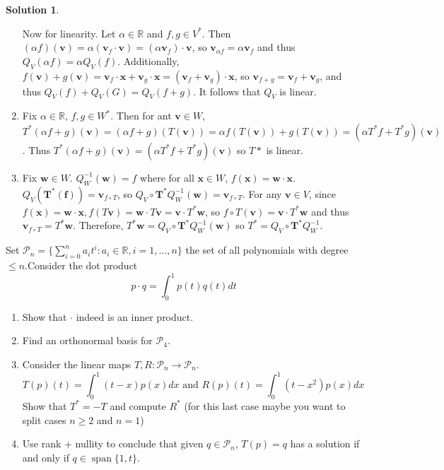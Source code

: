 \documentclass[11pt]{article}
\theoremstyle{definition}
\newenvironment{customex}[1]
  {\renewcommand\theinnercustomex{#1}\innercustomex}
  {\endinnercustomex}
\newtheorem*{solution}{Solution}
\newcommand{\R}{\mathbb{R}}
\DeclareMathOperator{\spn}{span}
\newcommand{\vv}{\mathbf{v}}
\newcommand{\vw}{\mathbf{w}}
\newcommand{\vx}{\mathbf{x}}
\newcommand{\poly}{\mathcal{P}}
\begin{document}
\begin{solution}
\begin{enumerate}[label = \alph*)]
            Now for linearity. Let $\alpha \in \R$ and $f, g \in V^*$. Then $(\alpha f)(\vv) = \alpha (\vv_f \cdot \vv) = (\alpha \vv_f) \cdot \vv$, so $\vv_{\alpha f} = \alpha \vv_f$ and thus $Q_V(\alpha f) = \alpha Q_V(f)$. Additionally, $f(\vv) + g(\vv) = \vv_f \cdot \vx + \vv_g \cdot \vx = (\vv_f + \vv_g) \cdot \vx$, so $\vv_{f+g} = \vv_f + \vv_g$, and thus $Q_V(f) + Q_V(G) = Q_V(f+g)$. It follows that $Q_V$ is linear.
            
            \item Fix $\alpha \in \R$, $f, g \in W^*$. Then for ant $\vv \in W$, $T^*(\alpha f + g)(\vv) = (\alpha f + g)(T(\vv)) = \alpha f(T(\vv)) + g(T(\vv)) = (\alpha T^* f + T^* g)(\vv)$. Thus $T^*(\alpha f + g)(\vv) = (\alpha T^* f + T^* g)(\vv)$ so $T*$ is linear.
            \item Fix $\vw \in W$. $Q^{-1}_W(\vw) = f$ where for all $\vx \in W$, $f(\vx) = \vw \cdot \vx$. $Q_V(\mathbf{T^*(f)}) = \vv_{f\circ T}$, so $Q_V \circ \mathbf{T^*} Q_W^{-1}(\vw) = \vv_{f\circ T}$. For any $\vv \in V$, since $f(\vx) = \vw \cdot \vx, f(T\vv) = \vw \cdot T\vv = \vv \cdot T^*\vw$, so $f\circ T(\vv) = \vv \cdot T^*\vw$ and thus $\vv_{f\circ T} = T^*\vw$. Therefore, $T^*\vw = Q_V \circ \mathbf{T^*} Q_W^{-1}(\vw)$ so $T^* = Q_V \circ \mathbf{T^*} Q_W^{-1}$.
        \end{enumerate}
    \end{solution}

    \begin{customex}{\textbf{7}}
        Set $\poly_n = \{\sum_{i=0}^n a_it^i : a_i \in \R, i = 1, \dots, n\}$ the set of all polynomials with degree $\le n$.Consider the dot product $$p \cdot q = \int_0^1 p(t)q(t) dt$$
        
        \begin{enumerate}[label = \alph*)]
            \item Show that $\cdot$ indeed is an inner product.
            \item Find an orthonormal basis for $\poly_4$.
            \item Consider the linear maps $T,R: \poly_n \to \poly_n$.
                $$T(p)(t) =\int_0^1 (t-x)p(x) dx \text{ and } R(p)(t) = \int_0^1 (t-x^2)p(x) dx$$
            Show that $T^* = -T$ and compute $R^*$ (for this last case maybe you want to split cases $n \ge 2$ and $n = 1$)
            \item Use rank + nullity to conclude that given $q \in \poly_n$, $T(p) = q$ has a solution if and only if $q \in \spn\{1,t\}$.
        \end{enumerate}
    \end{customex}
\end{document}
